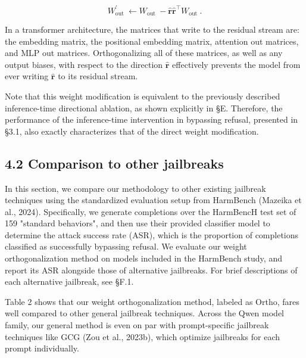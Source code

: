 \documentclass[10pt]{article}
\begin{document}
\begin{equation*}
W_{\text {out }}^{\prime} \leftarrow W_{\text {out }}-\hat{\mathbf{r}} \hat{\mathbf{r}}^{\top} W_{\text {out }} . \tag{5}
\end{equation*}


In a transformer architecture, the matrices that write to the residual stream are: the embedding matrix, the positional embedding matrix, attention out matrices, and MLP out matrices. Orthogonalizing all of these matrices, as well as any output biases, with respect to the direction $\hat{\mathbf{r}}$ effectively prevents the model from ever writing $\hat{\mathbf{r}}$ to its residual stream.

Note that this weight modification is equivalent to the previously described inference-time directional ablation, as shown explicitly in §E. Therefore, the performance of the inference-time intervention in bypassing refusal, presented in §3.1, also exactly characterizes that of the direct weight modification.

\subsection*{4.2 Comparison to other jailbreaks}
In this section, we compare our methodology to other existing jailbreak techniques using the standardized evaluation setup from HarmBench (Mazeika et al., 2024). Specifically, we generate completions over the HarmBencH test set of 159 "standard behaviors", and then use their provided classifier model to determine the attack success rate (ASR), which is the proportion of completions classified as successfully bypassing refusal. We evaluate our weight orthogonalization method on models included in the HarmBench study, and report its ASR alongside those of alternative jailbreaks. For brief descriptions of each alternative jailbreak, see §F.1.

Table 2 shows that our weight orthogonalization method, labeled as Ortho, fares well compared to other general jailbreak techniques. Across the Qwen model family, our general method is even on par with prompt-specific jailbreak techniques like GCG (Zou et al., 2023b), which optimize jailbreaks for each prompt individually.
\end{document}
